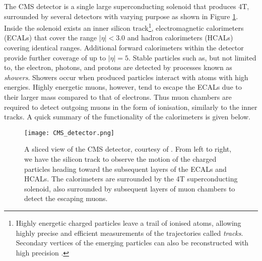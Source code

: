 The CMS detector \cite{chatrchyan2008cms} is a single large superconducting solenoid that produces 4T, surrounded by several detectors with varying purpose as shown in Figure \ref{fig:detector}. Inside the solenoid exists an inner silicon track\footnote{Highly energetic charged particles leave a trail of ionised atoms, allowing highly precise and efficient measurements of the trajectories called \textit{tracks}. Secondary vertices of the emerging particles can also be reconstructed with high precision \cite{chatrchyan2008cms}.}, electromagnetic calorimeters (ECALs) that cover the range $|\eta|<3.0$ and hadron calorimeters (HCALs) covering identical ranges. Additional forward calorimeters within the detector provide further coverage of up to $|\eta|=5$. Stable particles such as, but not limited to, the electron, photons, and protons are detected by processes known as \textit{showers}. Showers occur when produced particles interact with atoms with high energies. Highly energetic muons, however, tend to escape the ECALs due to their larger mass compared to that of electrons. Thus muon chambers are required to detect outgoing muons in the form of ionisation, similarly to the inner tracks.  A quick summary of the functionality of the calorimeters is given below. \\

\begin{figure}[htbp]
    \centering
    \texttt{[image: CMS\_detector.png]}
    \caption{A sliced view of the CMS detector, courtesy of \cite{ATLASandCMSDetector}. From left to right, we have the silicon track to observe the motion of the charged particles heading toward the subsequent layers of the ECALs and HCALs. The calorimeters are surrounded by the 4T superconducting solenoid, also surrounded by subsequent layers of muon chambers to detect the escaping muons.}
    \label{fig:detector}
\end{figure}

